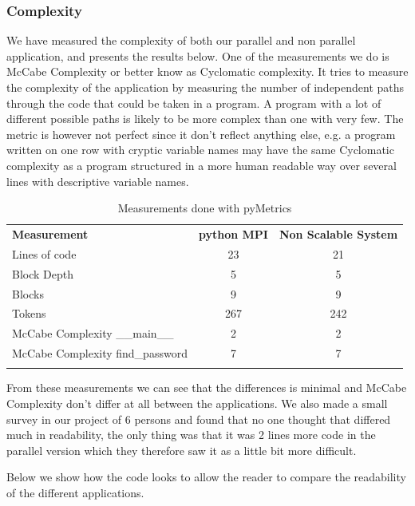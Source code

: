 \documentclass{article}
\begin{document}
{\subsubsection{Complexity}
We have measured the complexity of both our parallel and non parallel
application, and presents the results below. One of the measurements
we do is McCabe Complexity\cite{mccabe1976complexity} or better know as
Cyclomatic complexity. It tries to measure the complexity of the 
application by measuring the number of independent paths through the
code that could be taken in a program. A program with a lot of different
possible paths is likely to be more complex than one with very few. The
metric is however not perfect since it don't reflect anything else, e.g.  a
program written on one row with cryptic variable names may have the same
Cyclomatic complexity as a program structured in a more human readable way
over several lines with descriptive variable names.

\begin{table}[h!]
\begin{tabular}{l c c}
  \rowcolor[gray]{0.5}
  {\bf Measurement} & {\bf python MPI} & {\bf Non Scalable System} \\
  Lines of code &  23  &  21 \\
  Block Depth   &   5  &   5  \\
  Blocks        &   9  &   9  \\
  Tokens        & 267  & 242  \\
  McCabe Complexity \_\_main\_\_ & 2  & 2 \\
  McCabe Complexity find\_password & 7  & 7  \\
\rowcolor[gray]{0.5}
\end{tabular}
\caption{ Measurements done with pyMetrics\cite{pymetrics}}
\end{table}
From these measurements we can see that the differences is minimal and
McCabe Complexity\cite{mccabe1976complexity} don't differ at all between
the applications. We also made a small survey in our project of 6 persons
and found that no one thought that differed much in readability, the only
thing was that it was 2 lines more code in the parallel version which they
therefore saw it as a little bit more difficult. 
\newline

Below we show how the code looks to allow the reader to compare the readability
of the different applications. 

}
\end{document}
